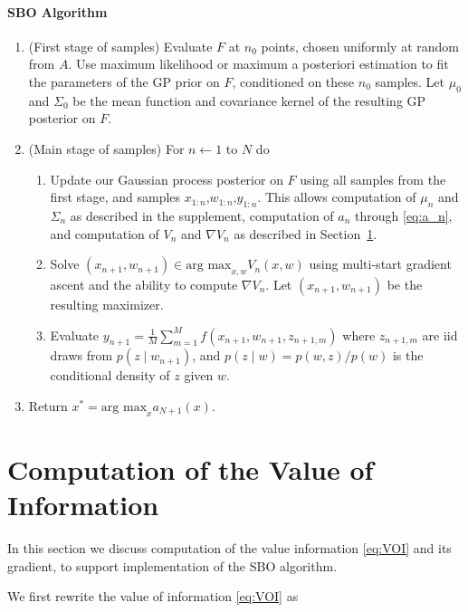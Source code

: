 \documentclass{article} %
\newcommand{\w}{w}
\newcommand{\z}{z}
\begin{document}
\paragraph{SBO Algorithm}
\begin{enumerate}
\item (First stage of samples) Evaluate $F$ at $n_0$ points, chosen uniformly at random from $A$. 
    Use maximum likelihood or maximum a posteriori estimation to fit the parameters of the GP prior on $F$, conditioned on these $n_0$ samples.
    Let $\mu_0$ and $\Sigma_0$ be the mean function and covariance kernel of the resulting GP posterior on $F$.
\item (Main stage of samples) For $n\leftarrow1$ to $N$ do

\begin{enumerate}
    \item Update our Gaussian process posterior on $F$ using all samples from the first stage, and samples $x_{1:n}$,$\w_{1:n}$,$y_{1:n}$.  This allows computation of $\mu_n$ and $\Sigma_n$ as described in the supplement, computation of $a_{n}$ through \eqref{eq:a_n}, and computation of $V_{n}$ and $\nabla V_{n}$ as described in Section~\ref{sec:VOI}.
\item Solve $\left(x_{n+1},\w_{n+1}\right)\in\mbox{arg max}_{x,\w}V_{n}\left(x,\w\right)$ using multi-start gradient ascent and the ability to compute $\nabla V_n$. Let $\left(x_{n+1},\w_{n+1}\right)$
be the resulting maximizer.
\item Evaluate $y_{n+1}=\frac{1}{M}\sum_{m=1}^{M}f\left(x_{n+1},\w_{n+1},\z_{n+1,m}\right)$
where $\z_{n+1,m}$ are iid draws from  $p\left(\z\mid w_{n+1}\right)$,
and $p(z\mid \w) = p(\w,\z)/p(\w)$ is the conditional density of $\z$ given $\w$.
\end{enumerate}
\item Return $x^{*}=\mbox{arg max}_{x}a_{N+1}\left(x\right).$
\end{enumerate}




\section{Computation of the Value of Information}
\label{sec:VOI}

In this section we discuss computation of the value information \eqref{eq:VOI} and its gradient, to support implementation of the SBO algorithm.

We first rewrite the value of information \eqref{eq:VOI} as
\end{document}
